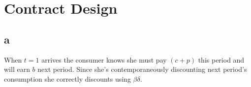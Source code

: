 \documentclass{article}
\begin{document}
   

\section{Contract Design}



\subsection*{a}


When $t=1$ arrives the consumer knows she must pay $(c+p)$ this period and will 
earn $b$ next period. Since she's contemporaneously discounting next period's 
consumption she correctly discounts using $\beta \delta$.
\end{document}
